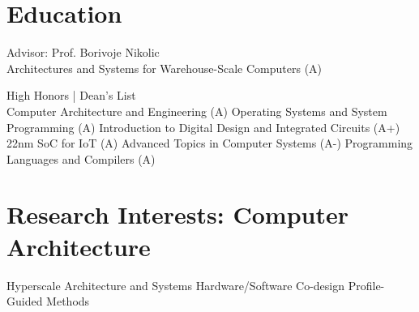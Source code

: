 \documentclass[]{deedy-resume-openfont}
\begin{document}
%
%

%
%



\section{Education}


Advisor: Prof. Borivoje Nikolic
\vspace*{3pt}
\\
 Architectures and Systems for Warehouse-Scale Computers (A)

\vspace{6pt}

High Honors | Dean's List
\vspace*{3pt}
\\
 Computer Architecture and Engineering (A)
\textbullet{}
Operating Systems and System Programming (A)
\textbullet{}
Introduction to Digital Design and Integrated Circuits (A+)
\textbullet{}
22nm SoC for IoT (A)
\textbullet{}
Advanced Topics in Computer Systems (A-)
\textbullet{}
Programming Languages and Compilers (A)

\sectionsep

\section{Research Interests: Computer Architecture}
Hyperscale Architecture and Systems 
\textbullet{} 
Hardware/Software Co-design 
\textbullet{}
Profile-Guided Methods
\sectionsep
\end{document}
